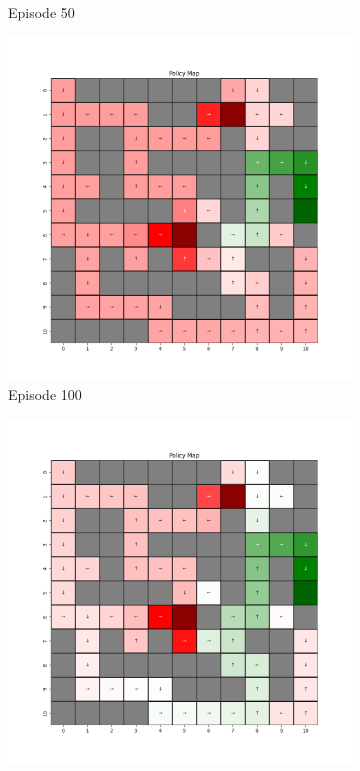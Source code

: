 \documentclass{assignment}
\begin{document}
\begin{figure}[H]
\begin{subfigure}{0.3\textwidth}
    \caption{Episode 50}
    \end{subfigure}\hfill
    \begin{subfigure}{0.3\textwidth}
        \includegraphics[width=\textwidth]{figures/policy_td/epsilon_sweep/policy_alpha_0.1_gamma_0.95_epsilon_0.0_iteration_100.png}
    \caption{Episode 100}
    \end{subfigure}
    \begin{subfigure}{0.3\textwidth}
        \includegraphics[width=\textwidth]{figures/policy_td/epsilon_sweep/policy_alpha_0.1_gamma_0.95_epsilon_0.0_iteration_1000.png}

\end{subfigure}
\end{figure}
\end{document}
